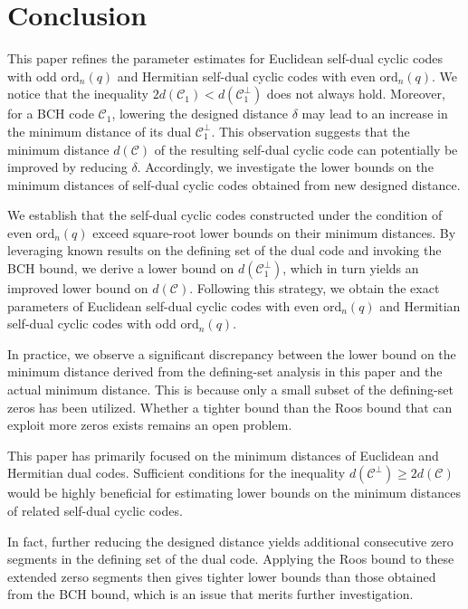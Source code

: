 \documentclass[journal,12pt,onecolumn]{IEEEtran}
\begin{document}
\section{Conclusion}
\label{5}
This paper refines the parameter estimates for Euclidean self-dual cyclic codes with odd $\mathrm{ord}_n(q)$ and Hermitian self-dual cyclic codes with even $\mathrm{ord}_n(q)$. We notice that the inequality $2d(\mathcal{C}_1) < d(\mathcal{C}_1^\perp)$ does not always hold. Moreover, for a BCH code $\mathcal{C}_1$, lowering the designed distance $\delta$ may lead to an increase in the minimum distance of its dual $\mathcal{C}_1^\perp$. This observation suggests that the minimum distance $d(\mathcal{C})$ of the resulting self-dual cyclic code can potentially be improved by reducing $\delta$. Accordingly, we investigate the lower bounds on the minimum distances of self-dual cyclic codes obtained from new designed distance.

We establish that the self-dual cyclic codes constructed under the condition of even $\mathrm{ord}_n(q)$ exceed square-root lower bounds on their minimum distances. By leveraging known results on the defining set of the dual code and invoking the BCH bound, we derive a lower bound on $d(\mathcal{C}_1^\perp)$, which in turn yields an improved lower bound on $d(\mathcal{C})$. Following this strategy, we obtain the exact parameters of Euclidean self-dual cyclic codes with even $\mathrm{ord}_n(q)$ and Hermitian self-dual cyclic codes with odd $\mathrm{ord}_n(q)$. 

In practice, we observe a significant discrepancy between the lower bound on the minimum distance derived from the defining-set analysis in this paper and the actual minimum distance. This is because only a small subset of the defining-set zeros has been utilized. Whether a tighter bound than the Roos bound that can exploit more zeros exists remains an open problem.

This paper has primarily focused on the minimum distances of Euclidean and Hermitian dual codes. Sufficient conditions for the inequality $d(\mathcal{C}^\perp) \ge 2d(\mathcal{C})$ would be highly beneficial for estimating lower bounds on the minimum distances of related self-dual cyclic codes.

In fact, further reducing the designed distance yields additional consecutive zero segments in the defining set of the dual code. Applying the Roos bound to these extended zerso segments then gives tighter lower bounds than those obtained from the BCH bound, which is an issue that merits further investigation.
\end{document}
